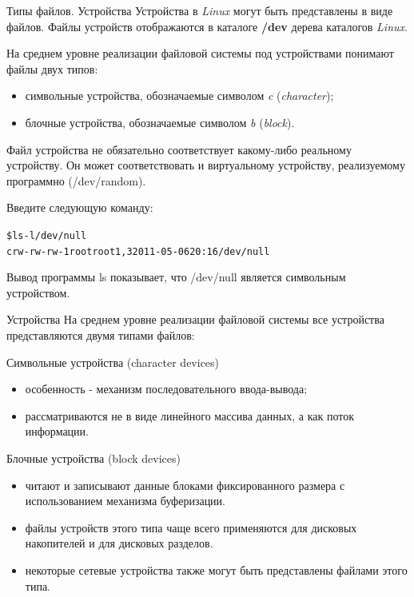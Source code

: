 \documentclass[xcolor=table]{beamer}
\begin{document}
\begin{frame}[fragile]{Типы файлов. Устройства}
	Устройства в \textit{Linux} могут быть представлены в виде файлов. 
	Файлы устройств отображаются в каталоге \textbf{/dev} дерева каталогов \textit{Linux}.

	На среднем уровне реализации файловой системы под устройствами понимают файлы двух типов:
	\begin{itemize}
		\item символьные устройства, обозначаемые символом \textit{c} (\textit{character});
		\item блочные устройства, обозначаемые символом \textit{b} (\textit{block}).
	\end{itemize}
	Файл устройства не обязательно соответствует какому-либо реальному устройству. Он может соответствовать и виртуальному устройству, реализуемому программно (/dev/random). 
	\begin{block}{Введите следующую команду:}
		\begin{alltt}
			\$ ls -l /dev/null
			crw-rw-rw- 1 root root 1, 3 2011-05-06 20:16 /dev/null
		\end{alltt}
	\end{block}
	Вывод программы ls показывает, что /dev/null является символьным устройством.
\end{frame}

\begin{frame}[fragile]{Устройства}
	На среднем уровне реализации файловой системы все устройства представляются двумя типами файлов:
	\begin{block}{Символьные устройства (character devices)}
		\begin{itemize}
			\item особенность - механизм последовательного ввода-вывода;
			\item рассматриваются не в виде линейного массива данных, а как поток информации.
		\end{itemize}
	\end{block}
	\begin{block}{Блочные устройства (block devices)}
		\begin{itemize}
			\item читают и записывают данные блоками фиксированного размера с использованием механизма буферизации. 
			\item файлы устройств этого типа чаще всего применяются для дисковых накопителей и для дисковых разделов. 
			\item некоторые сетевые устройства также могут быть представлены файлами этого типа.
		\end{itemize}
	\end{block}
\end{frame}
\end{document}
